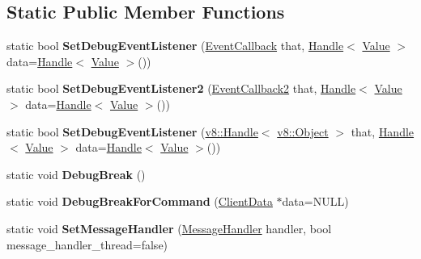 \subsection*{Static Public Member Functions}
\begin{DoxyCompactItemize}
\item 
\hypertarget{classv8_1_1_debug_a745bc83ba29626b64151a1a3e9759e8a}{}static bool {\bfseries Set\+Debug\+Event\+Listener} (\hyperlink{classv8_1_1_debug_a4be52510b70764b730dd1289bd9bbe37}{Event\+Callback} that, \hyperlink{classv8_1_1_handle}{Handle}$<$ \hyperlink{classv8_1_1_value}{Value} $>$ data=\hyperlink{classv8_1_1_handle}{Handle}$<$ \hyperlink{classv8_1_1_value}{Value} $>$())\label{classv8_1_1_debug_a745bc83ba29626b64151a1a3e9759e8a}

\item 
\hypertarget{classv8_1_1_debug_aff46ffb7c2a8e9c6549a7ef74452fce5}{}static bool {\bfseries Set\+Debug\+Event\+Listener2} (\hyperlink{classv8_1_1_debug_aae787219311eeedcbbe2c63cf36d1e53}{Event\+Callback2} that, \hyperlink{classv8_1_1_handle}{Handle}$<$ \hyperlink{classv8_1_1_value}{Value} $>$ data=\hyperlink{classv8_1_1_handle}{Handle}$<$ \hyperlink{classv8_1_1_value}{Value} $>$())\label{classv8_1_1_debug_aff46ffb7c2a8e9c6549a7ef74452fce5}

\item 
\hypertarget{classv8_1_1_debug_a9195f4cb819848a07dc71a5bae43274d}{}static bool {\bfseries Set\+Debug\+Event\+Listener} (\hyperlink{classv8_1_1_handle}{v8\+::\+Handle}$<$ \hyperlink{classv8_1_1_object}{v8\+::\+Object} $>$ that, \hyperlink{classv8_1_1_handle}{Handle}$<$ \hyperlink{classv8_1_1_value}{Value} $>$ data=\hyperlink{classv8_1_1_handle}{Handle}$<$ \hyperlink{classv8_1_1_value}{Value} $>$())\label{classv8_1_1_debug_a9195f4cb819848a07dc71a5bae43274d}

\item 
\hypertarget{classv8_1_1_debug_a4db63a9c8002f967e34bd795c2d9387b}{}static void {\bfseries Debug\+Break} ()\label{classv8_1_1_debug_a4db63a9c8002f967e34bd795c2d9387b}

\item 
\hypertarget{classv8_1_1_debug_a18287f492e1fc709d4a8bba87246ffd3}{}static void {\bfseries Debug\+Break\+For\+Command} (\hyperlink{classv8_1_1_debug_1_1_client_data}{Client\+Data} $\ast$data=N\+U\+L\+L)\label{classv8_1_1_debug_a18287f492e1fc709d4a8bba87246ffd3}

\item 
\hypertarget{classv8_1_1_debug_ab079dd46bc3989eb990c7ef40604c5a2}{}static void {\bfseries Set\+Message\+Handler} (\hyperlink{classv8_1_1_debug_aea5c8ab838a3b3c263a71828fb0767ac}{Message\+Handler} handler, bool message\+\_\+handler\+\_\+thread=false)\label{classv8_1_1_debug_ab079dd46bc3989eb990c7ef40604c5a2}


\end{DoxyCompactItemize}
